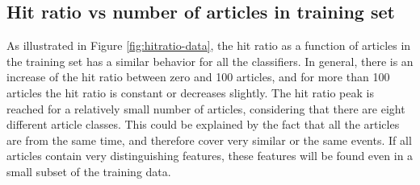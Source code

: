 \subsection{Hit ratio vs number of articles in training set}
As illustrated in Figure \ref{fig:hitratio-data}, the hit ratio as a function of articles in the training set has a similar behavior for all the classifiers. In general, there is an increase of the hit ratio between zero and 100 articles, and for more than 100 articles the hit ratio is constant or decreases slightly. The hit ratio peak is reached for a relatively small number of articles, considering that there are eight different article classes. This could be explained by the fact that all the articles are from the same time, and therefore cover very similar or the same events. If all articles contain very distinguishing features, these features will be found even in a small subset of the training data.
